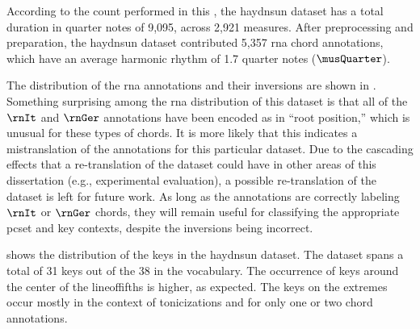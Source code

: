 
According to the count performed in this \thesisdiss{}, the
\gls{haydnsun} dataset has a total duration in quarter notes
of 9,095, across 2,921 measures. After preprocessing and
preparation, the \gls{haydnsun} dataset contributed 5,357
\gls{rna} chord annotations, which have an average harmonic
rhythm of 1.7 quarter notes ($\musQuarter$).

The distribution of the \gls{rna} annotations and their
inversions are shown in .
Something surprising among the \gls{rna} distribution of
this dataset is that all of the $\rnIt$ and $\rnGer$
annotations have been encoded as in ``root position,'' which
is unusual for these types of chords. It is more likely that
this indicates a mistranslation of the annotations for this
particular dataset. Due to the cascading effects that a
re-translation of the dataset could have in other areas of
this dissertation (e.g., experimental evaluation), a
possible re-translation of the dataset is left for future
work. As long as the annotations are correctly labeling
$\rnIt$ or $\rnGer$ chords, they will remain useful for
classifying the appropriate \gls{pcset} and key contexts,
despite the inversions being incorrect.



 shows the distribution of the
keys in the \gls{haydnsun} dataset. The dataset spans a
total of 31 keys out of the 38 in the vocabulary. The
occurrence of keys around the center of the
\gls{lineoffifths} is higher, as expected. The keys on the
extremes occur mostly in the context of tonicizations and
for only one or two chord annotations. 
